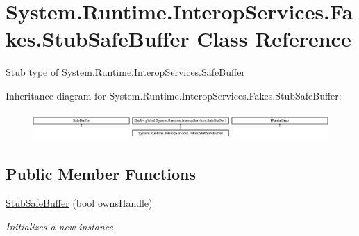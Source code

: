 \hypertarget{class_system_1_1_runtime_1_1_interop_services_1_1_fakes_1_1_stub_safe_buffer}{\section{System.\-Runtime.\-Interop\-Services.\-Fakes.\-Stub\-Safe\-Buffer Class Reference}
\label{class_system_1_1_runtime_1_1_interop_services_1_1_fakes_1_1_stub_safe_buffer}
}


Stub type of System.\-Runtime.\-Interop\-Services.\-Safe\-Buffer 


Inheritance diagram for System.\-Runtime.\-Interop\-Services.\-Fakes.\-Stub\-Safe\-Buffer\-:\begin{figure}[H]
\begin{center}
\leavevmode
\includegraphics[height=1.048689cm]{class_system_1_1_runtime_1_1_interop_services_1_1_fakes_1_1_stub_safe_buffer}
\end{center}
\end{figure}
\subsection*{Public Member Functions}
\begin{DoxyCompactItemize}
\item 
\hyperlink{class_system_1_1_runtime_1_1_interop_services_1_1_fakes_1_1_stub_safe_buffer_ac163610d855c20e8f85776a24e21d1fa}{Stub\-Safe\-Buffer} (bool owns\-Handle)
\begin{DoxyCompactList}\small\item\em Initializes a new instance\end{DoxyCompactList}\end{DoxyCompactItemize}
